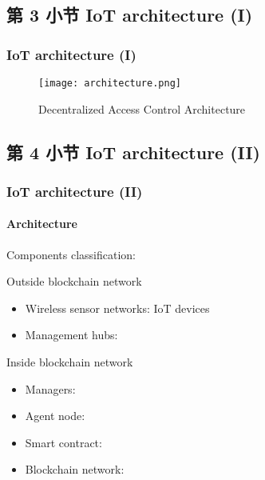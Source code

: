 \documentclass[
    aspectratio=169,                   %
]{beamer}
\begin{document}
\subsection{第 3 小节 IoT architecture (I)}

    \begin{frame}
        \frametitle{IoT architecture (I)}

        
        \begin{figure}
            \centering
            \begin{stampbox}
                \texttt{[image: architecture.png]}
            \end{stampbox}
            \caption{Decentralized Access Control Architecture}
        \end{figure}
    \end{frame}

\subsection{第 4 小节 IoT architecture (II)}

    \begin{frame}
        \frametitle{IoT architecture (II)}

        \paragraph{Architecture} Components classification:

        \begin{block}{Outside blockchain network}
            \begin{itemize}
                \item \alert{Wireless sensor networks}: IoT devices 
                \item \alert{Management hubs}:
            \end{itemize}
        \end{block}

        \begin{block}{Inside blockchain network}
            \begin{itemize}
            \item \alert{Managers}: 
            \item \alert{Agent node}:
            \item \alert{Smart contract}: 
            \item \alert{Blockchain network}: 
            \end{itemize}
        \end{block}
    \end{frame}
\end{document}
